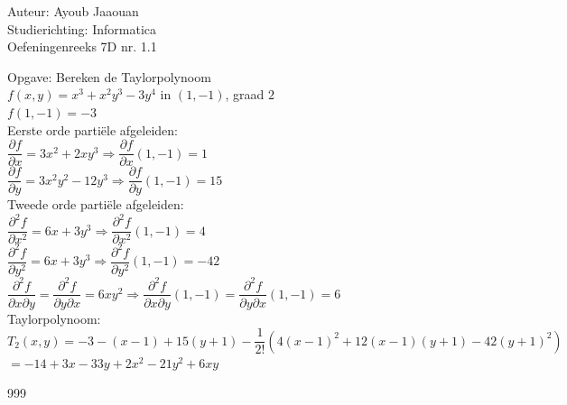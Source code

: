 \documentclass[a4paper]{article}
\begin{document}
\noindent \large Auteur: Ayoub Jaaouan \\
\noindent \large Studierichting: Informatica\\
\noindent \large Oefeningenreeks 7D nr. 1.1\\
\medskip

\normalsize

Opgave: Bereken de Taylorpolynoom\\

$f(x, y) = x^3 + x^2y^3-3y^4$ in $(1,-1)$, graad $2$\\

$f(1, -1) =  -3$\\

Eerste orde parti\"ele afgeleiden:\\

$\dfrac{\partial f}{\partial x} = 3x^2+2xy^3  \Rightarrow \dfrac{\partial f}{\partial x}(1, -1) = 1$\\

$\dfrac{\partial f}{\partial y} = 3x^2y^2-12y^3  \Rightarrow \dfrac{\partial f}{\partial y}(1, -1) = 15$\\

Tweede orde parti\"ele afgeleiden:\\

$\dfrac{\partial^2 f}{\partial x^2} = 6x+3y^3 \Rightarrow \dfrac{\partial^2 f}{\partial x^2}(1, -1) = 4$\\

$\dfrac{\partial^2 f}{\partial y^2} = 6x+3y^3 \Rightarrow \dfrac{\partial^2 f}{\partial y^2}(1, -1) = -42$\\

$\dfrac{\partial^2 f}{\partial x\partial y} = \dfrac{\partial^2 f}{\partial y\partial x} = 6xy^2 \Rightarrow \dfrac{\partial^2 f}{\partial x\partial y}(1, -1) = \dfrac{\partial^2 f}{\partial y\partial x}(1, -1) = 6$\\

Taylorpolynoom:\\

$T_2 (x, y) = -3 - (x-1) + 15(y+1) - \dfrac{1}{2!}\left(4(x-1)^2+12(x-1)(y+1)-42(y+1)^2\right)  $\\

$ = -14 +3x -33y +2x^2 -21y^2 + 6xy$\\



\begin{thebibliography}{999}
\end{thebibliography}
\end{document}
